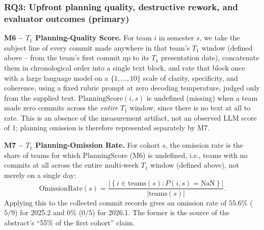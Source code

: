 \documentclass[conference]{IEEEtran}
\begin{document}
\subsubsection{RQ3: Upfront planning quality, destructive rework, and evaluator outcomes (primary)}

\textbf{M6 -- $T_1$ Planning-Quality Score.} For team $i$ in semester $s$, we
take the subject line of every commit made anywhere in that team's $T_1$
window (defined above -- from the team's first commit up to its $T_1$
presentation date), concatenate them in chronological order into a single
text block, and rate that block once with a large language model on a
$\{1,\dots,10\}$ scale of clarity, specificity, and coherence, using a
fixed rubric prompt at zero decoding temperature, judged only from the
supplied text. $\mathrm{PlanningScore}(i,s)$ is undefined (missing) when a
team made zero commits across the \emph{entire} $T_1$ window, since there
is no text at all to rate. This is an absence of the measurement artifact,
not an observed LLM score of 1; planning omission is therefore represented
separately by M7.

\textbf{M7 -- $T_1$ Planning-Omission Rate.} For cohort $s$, the omission
rate is the share of teams for which $\mathrm{PlanningScore}$ (M6) is
undefined, i.e., teams with no commits at all across the entire multi-week
$T_1$ window (defined above), not merely on a single day:
\[
\mathrm{OmissionRate}(s)
=\frac{\left|\left\{i\in\mathrm{teams}(s):P(i,s)=\mathrm{NaN}\right\}\right|}
       {|\mathrm{teams}(s)|}.
\]
Applying this to the collected commit records gives an omission rate of
$55.6\%$ ($5/9$) for 2025.2 and $0\%$ ($0/5$) for 2026.1. The former is the
source of the abstract's ``55\% of the first cohort'' claim.
\end{document}
